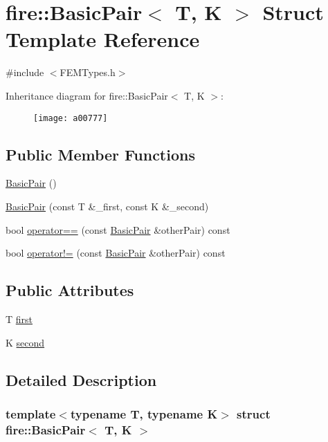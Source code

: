 \hypertarget{a00777}{}\section{fire\+:\+:Basic\+Pair$<$ T, K $>$ Struct Template Reference}
\label{a00777}


{\ttfamily \#include $<$F\+E\+M\+Types.\+h$>$}

Inheritance diagram for fire\+:\+:Basic\+Pair$<$ T, K $>$\+:\begin{figure}[H]
\begin{center}
\leavevmode
\texttt{[image: a00777]}
\end{center}
\end{figure}
\subsection*{Public Member Functions}
\begin{DoxyCompactItemize}
\item 
\hyperlink{a00777_a28eae46234d49126ac4727e7883174a4}{Basic\+Pair} ()
\item 
\hyperlink{a00777_ada8fa3f47bae245613d050598ac8488c}{Basic\+Pair} (const T \&\+\_\+first, const K \&\+\_\+second)
\item 
bool \hyperlink{a00777_acf9bd93b4bf7e16ca730a4dcc3ab859d}{operator==} (const \hyperlink{a00777}{Basic\+Pair} \&other\+Pair) const
\item 
bool \hyperlink{a00777_a8cff50c2cbaaa51cba83832d435455d7}{operator!=} (const \hyperlink{a00777}{Basic\+Pair} \&other\+Pair) const
\end{DoxyCompactItemize}
\subsection*{Public Attributes}
\begin{DoxyCompactItemize}
\item 
T \hyperlink{a00777_a4e073a19bf2d3330d105d81a8febc4be}{first}
\item 
K \hyperlink{a00777_aecd2977e2fb903a5b106e4b5d7ab3bac}{second}
\end{DoxyCompactItemize}


\subsection{Detailed Description}
\subsubsection*{template$<$typename T, typename K$>$\newline
struct fire\+::\+Basic\+Pair$<$ T, K $>$}

